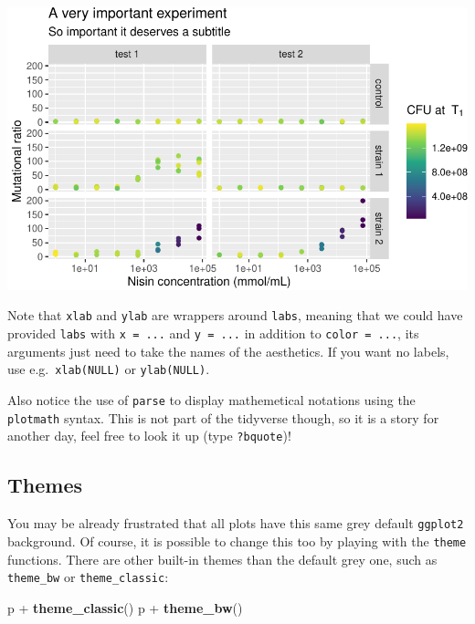 \documentclass[]{book}
\newenvironment{Shaded}{}{}
\newcommand{\KeywordTok}[1]{\textcolor[rgb]{0.00,0.44,0.13}{\textbf{#1}}}
\newcommand{\NormalTok}[1]{#1}
\newcommand{\OperatorTok}[1]{\textcolor[rgb]{0.40,0.40,0.40}{#1}}
\newcommand{\StringTok}[1]{\textcolor[rgb]{0.25,0.44,0.63}{#1}}
\begin{document}
\begin{center}\includegraphics[width=\textwidth]{TRES-Tidy-Tutorial_files/figure-latex/unnamed-chunk-143-1} \end{center}

Note that \texttt{xlab} and \texttt{ylab} are wrappers around \texttt{labs}, meaning that we could have provided \texttt{labs} with \texttt{x\ =\ ...} and \texttt{y\ =\ ...} in addition to \texttt{color\ =\ ...}, its arguments just need to take the names of the aesthetics. If you want no labels, use e.g.~\texttt{xlab(NULL)} or \texttt{ylab(NULL)}.

Also notice the use of \texttt{parse} to display mathemetical notations using the \texttt{plotmath} syntax. This is not part of the tidyverse though, so it is a story for another day, feel free to look it up (type \texttt{?bquote})!

\hypertarget{themes}{%
\subsection{Themes}\label{themes}}

You may be already frustrated that all plots have this same grey default \texttt{ggplot2} background. Of course, it is possible to change this too by playing with the \texttt{theme} functions. There are other built-in themes than the default grey one, such as \texttt{theme\_bw} or \texttt{theme\_classic}:

\begin{Shaded}
\begin{Highlighting}[]
\NormalTok{p }\OperatorTok{+}\StringTok{ }\KeywordTok{theme_classic}\NormalTok{()}
\NormalTok{p }\OperatorTok{+}\StringTok{ }\KeywordTok{theme_bw}\NormalTok{()}
\end{Highlighting}
\end{Shaded}
\end{document}
